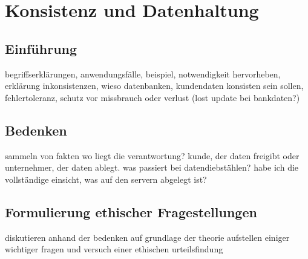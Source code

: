 \documentclass[letterpaper, 12pt]{article}
\let\tempsection\section
\renewcommand\section[1]{\vspace{-0.3cm}\tempsection{#1}\vspace{-0.3cm}}
\let\tempsubsection\subsection
\renewcommand\subsection[1]{\vspace{0cm}\tempsubsection{#1}\vspace{0cm}}
\begin{document}
\clearpage

\section{Konsistenz und Datenhaltung}

\subsection{Einführung}

begriffserklärungen, anwendungsfälle, beispiel, notwendigkeit hervorheben, erklärung inkonsistenzen, wieso datenbanken, kundendaten konsisten sein sollen, fehlertoleranz, schutz vor missbrauch oder verlust (lost update bei bankdaten?)

\subsection{Bedenken}

sammeln von fakten \newline
wo liegt die verantwortung? kunde, der daten freigibt oder unternehmer, der daten ablegt. was passiert bei datendiebstählen? habe ich die vollständige einsicht, was auf den servern abgelegt ist?

\subsection{Formulierung ethischer Fragestellungen}

diskutieren anhand der bedenken auf grundlage der theorie \newline
aufstellen einiger wichtiger fragen und versuch einer ethischen urteilsfindung

\clearpage



\lstlistoflistings
\listoffigures
\end{document}
